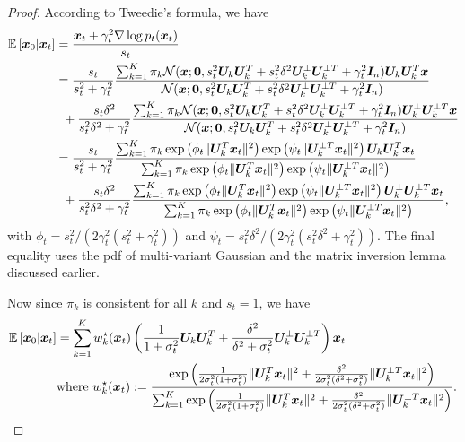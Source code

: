 \begin{proof}
    According to Tweedie's formula, we have
    \begin{align*}
        \operatorname{\mathbb{E}}\left[\bm x_0 \vert \bm x_t \right] & = \frac{\bm x_t + \gamma_t^2 \nabla \log p_t(\bm x_t)}{s_t}\\
        &= \frac{s_t}{s_t^2 + \gamma_t^2} \frac{\sum_{k=1}^K\pi_k \mathcal{N}(\bm x; \bm 0, s_t^2\bm U_k\bm U_k^{T} + s_t^2 \delta^2\bm U_k^{\perp}\bm U_k^{\perp T} + \gamma_t^2\bm I_n) \bm U_k\bm U_k^{T}  \bm x }{\mathcal{N}(\bm x; \bm 0, s_t^2\bm U_k\bm U_k^{T} + s_t^2 \delta^2\bm U_k^{\perp}\bm U_k^{\perp T} + \gamma_t^2\bm I_n)} \\ 
        &\;\;+ \frac{s_t\delta^2}{s_t^2\delta^2 + \gamma_t^2} \frac{\sum_{k=1}^K\pi_k \mathcal{N}(\bm x; \bm 0, s_t^2\bm U_k\bm U_k^{T} + s_t^2 \delta^2\bm U_k^{\perp}\bm U_k^{\perp T} + \gamma_t^2\bm I_n) \bm U_k^{\perp}\bm U_k^{\perp T}  \bm x }{\mathcal{N}(\bm x; \bm 0, s_t^2\bm U_k\bm U_k^{T} + s_t^2 \delta^2\bm U_k^{\perp}\bm U_k^{\perp T} + \gamma_t^2\bm I_n)} \\
        & = \dfrac{s_t}{s_t^2 + \gamma_t^2}  \frac{\sum_{k=1}^K \pi_k \exp\left(\phi_t \|\bm U_k^{T}\bm x_t\|^2\right)\exp\left(\psi_t \|\bm U_k^{\perp T}\bm x_t\|^2\right) \bm U_k\bm U_k^{T} \bm x_t}{\sum_{k=1}^K \pi_k \exp\left(\phi_t \|\bm U_k^{T}\bm x_t\|^2\right)\exp\left(\psi_t \|\bm U_k^{\perp T}\bm x_t\|^2\right)} \\
        &\;\; + \dfrac{s_t \delta^2}{s_t^2 \delta^2 + \gamma_t^2}  \frac{\sum_{k=1}^K \pi_k \exp\left(\phi_t \|\bm U_k^{T}\bm x_t\|^2\right)\exp\left(\psi_t \|\bm U_k^{\perp T}\bm x_t\|^2\right) \bm U_k^{\perp}\bm U_k^{\perp T} \bm x_t}{\sum_{k=1}^K \pi_k \exp\left(\phi_t \|\bm U_k^{T}\bm x_t\|^2\right)\exp\left(\psi_t \|\bm U_k^{\perp T}\bm x_t\|^2\right)},
    \end{align*}
    with $\phi_t = s_t^2 / (2 \gamma_t^2 (s_t^2 + \gamma_t^2))$ and $\psi_t = s_t^2\delta^2 / (2 \gamma_t^2 (s_t^2 \delta^2 + \gamma_t^2))$. The final equality uses the pdf of multi-variant Gaussian and the matrix inversion lemma discussed earlier.

    Now since $\pi_k$ is consistent for all $k$ and $s_t = 1$, we have
    \begin{align*}
        \operatorname{\mathbb{E}}\left[ \bm x_0\vert \bm x_t\right] &=  \sum_{k=1}^K w^{\star}_k(\bm x_t) \left( \frac{1}{1 + \sigma_t^2} \bm U_k\bm U_k^T + \frac{\delta^2}{\delta^2 + \sigma_t^2} \bm U_k^{\perp}\bm U_k^{\perp T} \right) \bm x_t \\
        &\text{where}\ w^{\star}_k(\bm x_t) := \frac{\exp\left( \frac{1}{2\sigma_t^2 (1 + \sigma_t^2)} \|\bm U_k^T \bm x_t\|^2 + \frac{\delta^2}{2 \sigma_t^2 (\delta^2 + \sigma_t^2)} \| \bm U_k^{\perp T} \bm x_t \|^2 \right)}{\sum_{k=1}^K \exp\left( \frac{1}{2\sigma_t^2 (1 + \sigma_t^2)} \|\bm U_k^T \bm x_t\|^2 + \frac{ \delta^2}{2 \sigma_t^2 (\delta^2 + \sigma_t^2)} \| \bm U_k^{\perp T} \bm x_t \|^2 \right)}.
    \end{align*}
\end{proof}


